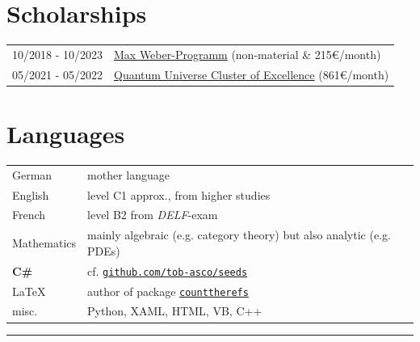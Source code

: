 \documentclass[english,10pt]{article}
\begin{document}
	\section*{Scholarships}
	\begin{tabularx}{\linewidth}{m{3cm}|X}
		10/2018 - 10/2023 & \href{https://www.elitenetzwerk.bayern.de/start/foerderangebote/max-weber-programm}{Max Weber-Programm} \hfill (non-material \& 215€/month)\\
		05/2021 - 05/2022 & \href{https://www.qu.uni-hamburg.de/}{Quantum Universe Cluster of Excellence} \hfill (861€/month)
	\end{tabularx}
	
	\section*{Languages}
	\begin{tabular}{m{3cm} | l}
		German & mother language\\
	English & level C1 approx., from higher studies\\
	French & level B2 from \textit{DELF}-exam\\
	Mathematics & mainly algebraic (e.g. category theory) but also analytic (e.g. PDEs)\\
	\textbf{C\#} & cf. \href{https://github.com/tob-asco/seeds}{\texttt{github.com/tob-asco/seeds}}\\
        \LaTeX & author of package \href{https://github.com/tob-asco/counttherefs.git}{\texttt{counttherefs}}\\
	misc. & Python, XAML, HTML, VB, C++
	\end{tabular}
    \vfill
	\hrule
\end{document}
